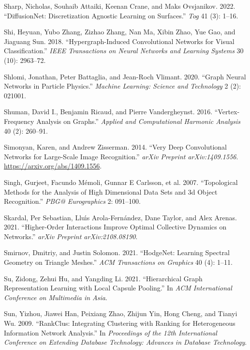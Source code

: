 \documentclass[
  12pt,
]{krantz}
\newlength{\cslhangindent}
\newenvironment{CSLReferences}[2] %
 {\begin{list}{}{%
  \setlength{\itemindent}{0pt}
  \setlength{\leftmargin}{0pt}
  \setlength{\parsep}{0pt}
  \ifodd #1
   \setlength{\leftmargin}{\cslhangindent}
   \setlength{\itemindent}{-1\cslhangindent}
  \fi
  \setlength{\itemsep}{#2\baselineskip}}}
 {\end{list}}
\begin{document}
\begin{CSLReferences}{1}{0}
Sharp, Nicholas, Souhaib Attaiki, Keenan Crane, and Maks Ovsjanikov.
2022. {``Diffusion{N}et: Discretization Agnostic Learning on
Surfaces.''} \emph{Tog} 41 (3): 1--16.

Shi, Heyuan, Yubo Zhang, Zizhao Zhang, Nan Ma, Xibin Zhao, Yue Gao, and
Jiaguang Sun. 2018. {``Hypergraph-Induced Convolutional Networks for
Visual Classification.''} \emph{IEEE Transactions on Neural Networks and
Learning Systems} 30 (10): 2963--72.

Shlomi, Jonathan, Peter Battaglia, and Jean-Roch Vlimant. 2020. {``Graph
Neural Networks in Particle Physics.''} \emph{Machine Learning: Science
and Technology} 2 (2): 021001.

Shuman, David I., Benjamin Ricaud, and Pierre Vandergheynst. 2016.
{``Vertex-Frequency Analysis on Graphs.''} \emph{Applied and
Computational Harmonic Analysis} 40 (2): 260--91.

Simonyan, Karen, and Andrew Zisserman. 2014. {``Very Deep Convolutional
Networks for Large-Scale Image Recognition.''} \emph{arXiv Preprint
arXiv:1409.1556}. \url{https://arxiv.org/abs/1409.1556}.

Singh, Gurjeet, Facundo Mémoli, Gunnar E Carlsson, et al. 2007.
{``Topological Methods for the Analysis of High Dimensional Data Sets
and 3d Object Recognition.''} \emph{PBG@ Eurographics} 2: 091--100.

Skardal, Per Sebastian, Lluı́s Arola-Fernández, Dane Taylor, and Alex
Arenas. 2021. {``Higher-Order Interactions Improve Optimal Collective
Dynamics on Networks.''} \emph{arXiv Preprint arXiv:2108.08190}.

Smirnov, Dmitriy, and Justin Solomon. 2021. {``Hodge{N}et: Learning
Spectral Geometry on Triangle Meshes.''} \emph{ACM Transactions on
Graphics} 40 (4): 1--11.

Su, Zidong, Zehui Hu, and Yangding Li. 2021. {``Hierarchical Graph
Representation Learning with Local Capsule Pooling.''} In \emph{ACM
International Conference on Multimedia in Asia}.

Sun, Yizhou, Jiawei Han, Peixiang Zhao, Zhijun Yin, Hong Cheng, and
Tianyi Wu. 2009. {``Rank{C}lus: Integrating Clustering with Ranking for
Heterogeneous Information Network Analysis.''} In \emph{Proceedings of
the 12th International Conference on Extending Database Technology:
Advances in Database Technology}.


\end{CSLReferences}
\end{document}
